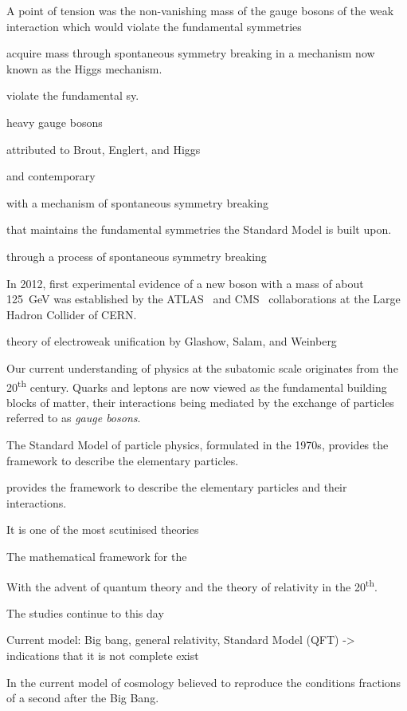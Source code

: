 A point of tension was the non-vanishing mass of the gauge bosons of the weak
interaction which would violate the fundamental symmetries

acquire mass through spontaneous symmetry breaking in a mechanism now known as
the Higgs mechanism.

violate the fundamental sy.

heavy gauge bosons

attributed to Brout, Englert, and Higgs~\cite{Englert:1964et,Higgs:1964pj}

and contemporary

with a mechanism of spontaneous symmetry breaking

that maintains the fundamental symmetries the Standard Model is built upon.

through a process of spontaneous symmetry breaking

In 2012, first experimental evidence of a new boson with a mass of about
\SI{125}{\GeV} was established by the ATLAS~\cite{HIGG-2012-27} and
CMS~\cite{CMS-HIG-12-028} collaborations at the Large Hadron Collider of CERN.

theory of electroweak unification by Glashow, Salam, and Weinberg



Our current understanding of physics at the subatomic scale originates from the
20\textsuperscript{th} century. Quarks and leptons are now viewed as the
fundamental building blocks of matter, their interactions being mediated by the
exchange of particles referred to as \emph{gauge bosons}.

The Standard Model of particle physics, formulated in the 1970s, provides the
framework to describe the elementary particles.

provides the framework to describe the
elementary particles and their interactions.

It is one of the most scutinised theories

The mathematical framework for the


With the advent of quantum theory and the theory of relativity in the
20\textsuperscript{th}.



The studies continue to this day

Current model: Big bang, general relativity, Standard Model (QFT)
-> indications that it is not complete exist

In the current model of cosmology believed to reproduce the conditions fractions
of a second after the Big Bang.

